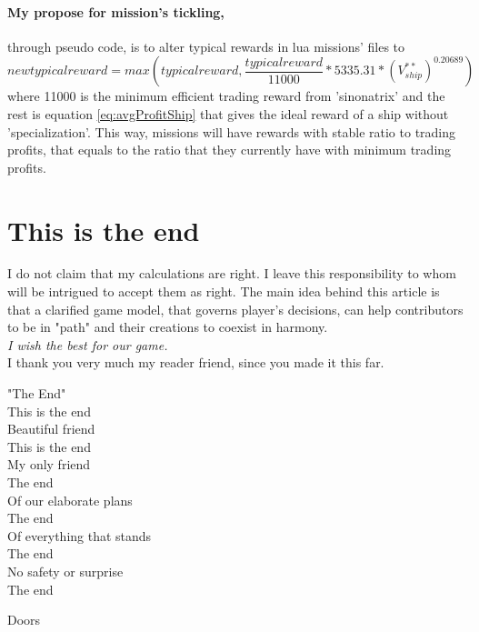 \documentclass[]{article}
\begin{document}
\paragraph{My propose for mission's tickling,} through  pseudo code, is to alter typical rewards in lua missions' files to
\[
	new typical reward = max(typical reward, \dfrac{typical reward}{11000}*5335.31*(V^{**}_{ship})^{0.20689})
\]
where 11000 is the minimum efficient trading reward from 'sinonatrix' and the rest is equation \eqref{eq:avgProfitShip} that gives the ideal reward of a ship without 'specialization'. This way, missions will have rewards with stable ratio to trading profits, that equals to the ratio that they currently have with minimum trading profits.
\section*{This is the end}
I do not claim that my calculations are right. I leave this responsibility to whom will be intrigued to accept them as right. The main idea behind this article is that a clarified game model, that governs player's decisions, can help contributors to be in "path" and their creations to coexist in harmony.\\
\emph{I wish the best for our game.}\\
I thank you very much my reader friend, since you made it this far.
\begin{center}
	"The End"\\
	\vspace{5mm}	
	This is the end\\
	Beautiful friend\\
	This is the end\\
	My only friend\\
	
	The end\\
	Of our elaborate plans\\
	The end\\
	Of everything that stands\\
	The end\\
	No safety or surprise\\
	The end
	\begin{flushright}
		Doors
	\end{flushright}
\end{center}
\end{document}
